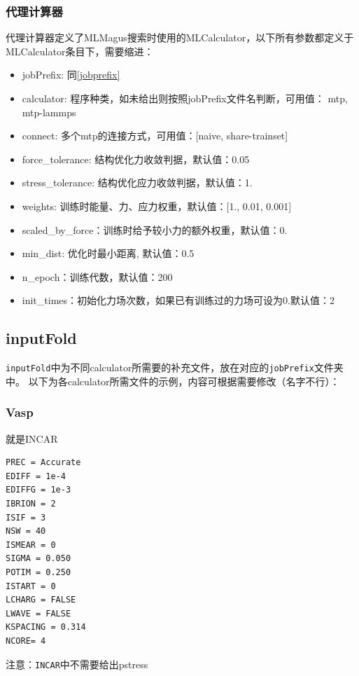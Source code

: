 \documentclass[12pt]{article}
\newcommand{\file}[1]{\texttt{#1}}
\begin{document}
\subsubsection{代理计算器}
代理计算器定义了MLMagus搜索时使用的MLCalculator，以下所有参数都定义于MLCalculator条目下，需要缩进：
\begin{itemize}
    \item jobPrefix: 同\ref{jobprefix}
    \item calculator: 程序种类，如未给出则按照jobPrefix文件名判断，可用值：
    {mtp, mtp-lammps}
    \item connect: 多个mtp的连接方式，可用值：[naive, share-trainset]
    \item force\_tolerance: 结构优化力收敛判据，默认值：0.05
    \item stress\_tolerance: 结构优化应力收敛判据，默认值：1.
    \item weights: 训练时能量、力、应力权重，默认值：[1., 0.01, 0.001]
    \item scaled\_by\_force：训练时给予较小力的额外权重，默认值：0.
    \item min\_dist: 优化时最小距离, 默认值：0.5
    \item n\_epoch：训练代数，默认值：200
    \item init\_times：初始化力场次数，如果已有训练过的力场可设为0.默认值：2 
\end{itemize}

\subsection{inputFold} \label{inputfold}
\file{inputFold}中为不同calculator所需要的补充文件，放在对应的\file{jobPrefix}文件夹中。
以下为各calculator所需文件的示例，内容可根据需要修改（名字不行）：
\subsubsection{Vasp}
\begin{tcolorbox}[enhanced, breakable, title = {INCAR}]
就是INCAR
\tcblower
\begin{verbatim}                                
PREC = Accurate
EDIFF = 1e-4
EDIFFG = 1e-3
IBRION = 2
ISIF = 3
NSW = 40
ISMEAR = 0
SIGMA = 0.050
POTIM = 0.250
ISTART = 0
LCHARG = FALSE
LWAVE = FALSE
KSPACING = 0.314
NCORE= 4
\end{verbatim}
\end{tcolorbox}
注意：\file{INCAR}中不需要给出pstress
\end{document}
